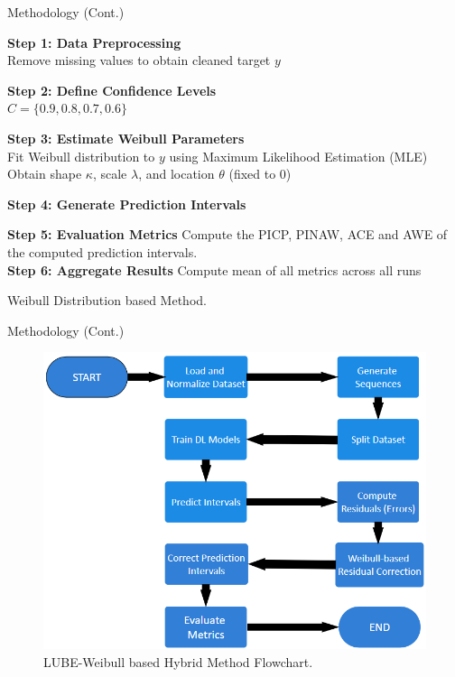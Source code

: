 \documentclass[xcolor=dvipsnames,aspectratio=169]{beamer}
\begin{document}
\begin{frame}{Methodology (Cont.)}
        \begin{algorithm}[H]
        \tiny
        \SetAlgoCaptionSeparator{:}

    
        \textbf{Step 1: Data Preprocessing}\\
        Remove missing values to obtain cleaned target $y$
    
        \textbf{Step 2: Define Confidence Levels}\\
        $C = \{0.9, 0.8, 0.7, 0.6\}$
    
        \textbf{Step 3: Estimate Weibull Parameters}\\
        Fit Weibull distribution to $y$ using Maximum Likelihood Estimation (MLE)\\
        Obtain shape $\kappa$, scale $\lambda$, and location $\theta$ (fixed to 0)
    
        \textbf{Step 4: Generate Prediction Intervals}\\
    
        \textbf{Step 5: Evaluation Metrics} Compute the PICP, PINAW, ACE and AWE of the computed prediction intervals.\\
        \textbf{Step 6: Aggregate Results} Compute mean of all metrics across all runs 
        \caption{Weibull Distribution based Method.}
        \end{algorithm}

\end{frame}

\begin{frame}{Methodology (Cont.)}
\begin{figure}
    \centering
    \includegraphics[width=0.5\linewidth]{LUBE_Weibull.png}
    \caption{LUBE-Weibull based Hybrid Method Flowchart.}
    \label{fig:enter-label}
\end{figure}
\end{frame}
\end{document}
